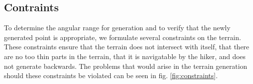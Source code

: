 
\subsection{Contraints}
\label{constraints}
To determine the angular range for generation and to verify that the newly generated point is appropriate, we formulate several constraints on the terrain.
These constraints ensure that the terrain does not intersect with itself, that there are no too thin parts in the terrain, that it is navigatable by the hiker, and does not generate backwards.
The problems that would arise in the terrain generation should these constraints be violated can be seen in fig. \ref{fig:constraints}.

